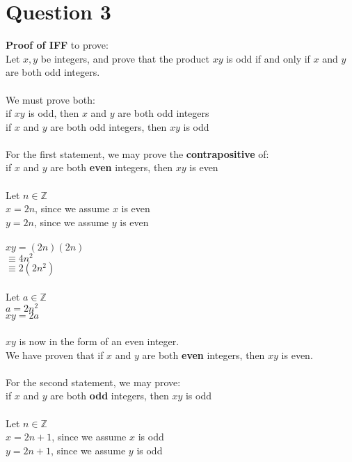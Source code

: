 \documentclass{article}
\begin{document}
    \section*{Question 3}
    \textbf{Proof of IFF} to prove: \\
    \indent Let $x, y$ be integers, and prove that the product $xy$ is odd if and only if $x$ and $y$ are both odd integers. \\ \\
    We must prove both: \\
    \indent if $xy$ is odd, then $x$ and $y$ are both odd integers \\
    \indent if $x$ and $y$ are both odd integers, then $xy$ is odd \\ \\
    For the first statement, we may prove the \textbf{contrapositive} of: \\
    \indent if $x$ and $y$ are both \textbf{even} integers, then $xy$ is even \\ \\
    Let $n \in \mathbb{Z}$ \\
    $x = 2n$, since we assume $x$ is even \\
    $y = 2n$, since we assume $y$ is even \\ \\
    $xy = (2n)(2n)$ \\
    $\equiv 4n^2$ \\
    $\equiv 2(2n^2)$ \\ \\
    Let $a \in \mathbb{Z}$ \\
    $a = 2n^2$ \\
    $xy = 2a$ \\ \\
    $xy$ is now in the form of an even integer. \\
    We have proven that if $x$ and $y$ are both \textbf{even} integers, then $xy$ is even. \\ \\
     For the second statement, we may prove: \\
    \indent if $x$ and $y$ are both \textbf{odd} integers, then $xy$ is odd \\ \\
    Let $n \in \mathbb{Z}$ \\
    $x = 2n + 1$, since we assume $x$ is odd \\
    $y = 2n + 1$, since we assume $y$ is odd \\ \\
\end{document}
